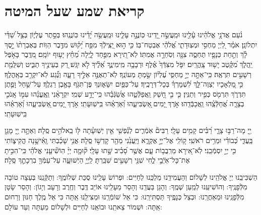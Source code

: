 \documentclass[twoside, openany, parskip=half, 11pt]{book}
\begin{document}
 




\chapter[קריאת שמע שעל המיטה]{ קריאת שמע שעל המיטה }

\shema

\veahavta

נֹ֨עַם אֲדֹנָ֥י אֱלֹהֵ֗ינוּ עָ֫לֵ֥ינוּ וּמַֽעֲשֵׂ֣ה יָ֭דֵינוּ כּֽוֹנֲנָ֣ה עָלֵ֑ינוּ וּמַֽעֲשֵׂ֥ה יָ֝דֵ֗ינוּ כּֽוֹנֲנֵֽהוּ׃
 בְּסֵ֣תֶר עֶלְי֑וֹן בְּצֵ֥ל שַׁ֝דַּ֗י יִתְלוֹנָֽן׃
אֹמַ֗ר לַ֭יְיָ מַחְסִ֣י וּמְצֽוּדָתִ֑י אֱ֝לֹהַ֗י אֶבְטַח־בּֽוֹ׃ 
כִּ֤י ה֣וּא יַ֭צִּֽילְֿךָ מִפַּ֥ח יָ֝ק֗וּשׁ מִדֶּ֥בֶר הַוּֽוֹת׃ 
בְּאֶבְרָת֨וֹ יָ֣סֶךְ לָ֗ךְ וְתַ֣חַת כְּנָפָ֣יו תֶּחְסֶ֑ה צִנָּ֖ה וְסֹֽחֵרָ֣ה אֲמִתּֽוֹ׃ 
לֹֽא־תִ֭ירָא מִפַּ֣חַד לָ֑יְלָה מֵ֝חֵ֗ץ יָע֥וּף יוֹמָֽם׃ 
מִ֭דֶּֽבֶר בָּאֹ֣פֶל יַֽהֲלֹ֑ךְ מִ֝קֶּ֗טֶב יָשׁ֥וּד צָֽהֳרָֽיִם׃ 
יִפֹּ֤ל מִצִּדְּֿךָ֙ אֶ֗לֶף וּרְבָבָ֥ה מִֽימִינֶ֑ךָ אֵ֝לֶ֗יךָ לֹ֣א יִגָּֽשׁ׃ 
רַ֭ק בְּעֵינֶ֣יךָ תַבִּ֑יט וְשִׁלֻּמַ֖ת רְשָׁעִ֣ים תִּרְאֶֽה׃ 
כִּֽי־אַתָּ֣ה יְיָ֣ מַחְסִּ֑י עֶ֝לְי֗וֹן שַׂ֣מְתָּ מְעוֹנֶֽךָ׃ 
לֹֽא־תְאֻנֶּ֣ה אֵלֶ֣יךָ רָעָ֑ה וְנֶ֗֝גַע לֹֽא־יִקְרַ֥ב בְּאָֽהֳלֶֽךָ׃ 
כִּ֣י מַ֭לְאָכָיו יְצַוֶּה־לָּ֑ךְ לִ֝שְׁמָרְךָ֗ בְּכָל־דְּרָכֶֽיךָ׃ 
עַל־כַּפַּ֥יִם יִשָּׂא֑וּנְךָ פֶּן־תִּגֹּ֖ף בָּאֶ֣בֶן רַגְלֶֽךָ׃ 
עַל־שַׁ֣חַל וָפֶ֣תֶן תִּדְרֹ֑ךְ תִּרְמֹ֖ס כְּפִ֣יר וְתַנִּֽין׃ 
כִּ֤י בִ֣י חָ֭שַׁק וַֽאֲפַלְּֿטֵ֑הוּ אֲשַׂ֝גְּֿבֵ֗הוּ כִּֽי־יָדַ֥ע שְׁמִֽי׃ 
יִקְרָאֵ֨נִי וְֽאֶֽעֱנֵ֗הוּ עִמּ֣וֹ אָֽנֹכִ֣י בְצָרָ֑ה אֲ֝חַלְּֿצֵֽ֗הוּ וַֽאֲכַבְּֿדֵֽהוּ׃ 
אֹ֣רֶךְ יָ֭מִים ֖אַשְׂבִּיעֵ֑הוּ וְ֝אַרְאֵ֗הוּ בִּֽישֽׁוּעָתִֽי׃
אֹ֣רֶךְ יָ֭מִים ֖אַשְׂבִּיעֵ֑הוּ וְ֝אַרְאֵ֗הוּ בִּֽישֽׁוּעָתִֽי׃

יְ֖יָ מָה־רַבּ֣וּ צָרָ֑י רַ֝בִּ֗ים קָמִ֥ים עָלָֽי׃ רַבִּים֘ אֹֽמְֿרִ֢ים לְנַ֫פְשִׁ֥י אֵ֤ין יְשֽׁוּעָ֓תָה לּ֖וֹ בֵֽאלֹהִ֣ים סֶֽלָה׃ וְאַתָּ֣ה יְ֖יָ מָגֵ֥ן בַּֽעֲדִ֑י כְּ֝בוֹדִ֗י וּמֵרִ֥ים רֹאשִֽׁי׃ ק֭וֹלִֽי אֶל־יְיָ֣ אֶקְרָ֑א וַיַּֽעֲנֵ֙נִי מֵהַ֖ר קָדְשׁ֣וֹ סֶֽלָה׃ אֲנִ֥י שָׁכַ֗בְתִּי וָֽאִ֫ישָׁ֥נָה הֱקִיצ֑וֹתִי כִּ֖י יְיָ֣ יִסְמְֿכֵֽנִי׃ לֹֽא־אִ֭ירָא מֵרִֽבֲב֥וֹת עָ֑ם אֲשֶׁ֥ר סָ֝בִ֗יב שָׁ֣תוּ עָלָֽי׃ ק֘וּמָ֤ה יְיָ֨ הֽוֹשִׁ֘יעֵ֤נִי אֱלֹהַ֗י כִּֽי־הִכִּ֣יתָ אֶת־כָּל־אֹֽיְֿבַ֣י לֶ֑חִי שִׁנֵּ֖י רְשָׁעִ֣ים שִׁבַּֽרְתָּ׃ לַֽיְיָ֥ הַיְשׁוּעָ֑ה עַל־עַמְּֿךָ֖ בִרְכָתֶ֣ךָ סֶּֽלָה׃

	הַשְׁכִּיבֵֽנוּ יְיָ אֱלֹהֵֽינוּ לְשָׁלוֹם וְהַעֲמִידֵֽנוּ מַלְכֵּֽנוּ לְחַיִּים: וּפְרוֹשׂ עָלֵֽינוּ סֻכַּת שְׁלוֹמֶֽךָ: וְתַקְּֿנֵֽנוּ בְּעֵצָה טוֹבָה מִלְּֿפָנֶֽיךָ: וְהוֹשִׁיעֵֽנוּ לְמַֽעַן שְׁמֶֽךָ: וְהָגֵן בַּעֲדֵֽנוּ וְהָסֵר מֵעָלֵֽינוּ אוֹיֵב דֶּֽבֶר וְחֶֽרֶב וְרָעָב וְיָגוֹן: וְהָסֵר שָׂטָן מִלְּֿפָנֵֽינוּ וּמֵאַחֲרֵֽנוּ: וּבְצֵל כְּנָפֶֽיךָ תַּסְתִּירֵֽנוּ: כִּי אֵל שׁוֹמְֿרֵֽנוּ וּמַצִּילֵֽנוּ אַֽתָּה כִּי אֵל מֶֽלֶךְ חַנּוּן וְרַחוּם אַֽתָּה: וּשְׁמוֹר צֵאתֵֽנוּ וּבוֹאֵֽנוּ לְחַיִּים וּלְשָׁלוֹם מֵעַתָּה וְעַד עוֹלָם:
\end{document}
